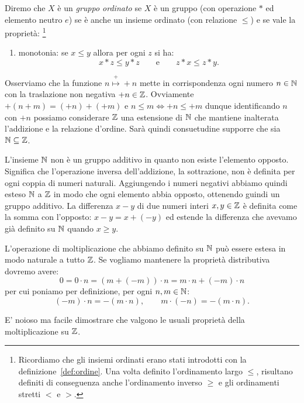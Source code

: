   \begin{definition}
    Diremo che $X$ è un \emph{gruppo ordinato}%
%
 se $X$ è un gruppo
    (con operazione $*$ ed elemento neutro $e$) 
    se è anche un insieme ordinato (con relazione $\le$)
    e se vale la proprietà:
    \footnote{
      Ricordiamo che gli insiemi ordinati erano stati introdotti 
      con la definizione~\ref{def:ordine}. 
      Una volta definito l'ordinamento largo $\le$, risultano 
      definiti di conseguenza anche l'ordinamento inverso $\ge$ e gli ordinamenti 
      stretti $<$ e $>$.
      }%
        \begin{enumerate}
      \item[1.] monotonia: se $x\le y$ allora per ogni $z$ si ha:
       \[
       x*z \le y*z \qquad\text{e}\qquad z*x \le z*y.
       \] 
    \end{enumerate}
  \end{definition}

  Osserviamo che la funzione $n\stackrel+\mapsto +n$ mette in corrispondenza 
  ogni numero $n\in {\mathbb N}$ con la traslazione non negativa $+n\in {\mathbb Z}$.
  Ovviamente $+(n+m) = (+n)+(+m)$ e $n\le m \iff +n \le +m$
  dunque identificando $n$ con $+n$ possiamo considerare ${\mathbb Z}$ una
  estensione di ${\mathbb N}$ che mantiene inalterata l'addizione e la relazione d'ordine.
  Sarà quindi consuetudine supporre che sia ${\mathbb N}\subseteq {\mathbb Z}$.

  L'insieme ${\mathbb N}$ non è un gruppo additivo in quanto non esiste l'elemento opposto.
  Significa che l'operazione inversa dell'addizione, la sottrazione, non è definita
  per ogni coppia di numeri naturali. 
  Aggiungendo i numeri negativi abbiamo quindi esteso ${\mathbb N}$ a ${\mathbb Z}$ in modo che 
  ogni elemento abbia opposto, ottenendo guindi un gruppo additivo.
  La differenza $x-y$ di due numeri interi $x,y\in {\mathbb Z}$ è definita come la somma 
  con l'opposto: $x-y = x + (-y)$ ed estende la differenza che avevamo già 
  definito su ${\mathbb N}$ quando $x\ge y$.

  L'operazione di moltiplicazione che abbiamo definito su ${\mathbb N}$ può essere 
  estesa in modo naturale a tutto ${\mathbb Z}$. 
  Se vogliamo mantenere la proprietà distributiva dovremo avere:
  \[
    0 = 0 \cdot n = (m+(-m))\cdot n = m\cdot n + (-m)\cdot n
  \]
  per cui poniamo per definizione, per ogni $n,m\in {\mathbb N}$:
  \[
    (-m) \cdot n = -(m\cdot n), \qquad  m \cdot (-n) = -(m\cdot n).
  \]

  E' noioso ma facile dimostrare che valgono le usuali proprietà della
  moltiplicazione su ${\mathbb Z}$.

